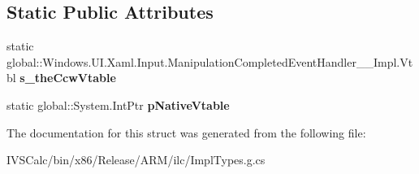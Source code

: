 \subsection*{Static Public Attributes}
\begin{DoxyCompactItemize}
\item 
\mbox{\label{struct_windows_1_1_u_i_1_1_xaml_1_1_input_1_1_manipulation_completed_event_handler_____impl_1_1_vtbl_adf2688a26a99e157d864b16386304f2d}} 
static global\+::\+Windows.\+U\+I.\+Xaml.\+Input.\+Manipulation\+Completed\+Event\+Handler\+\_\+\+\_\+\+Impl.\+Vtbl {\bfseries s\+\_\+the\+Ccw\+Vtable}
\item 
\mbox{\label{struct_windows_1_1_u_i_1_1_xaml_1_1_input_1_1_manipulation_completed_event_handler_____impl_1_1_vtbl_a85fcd24abcd8438395a05206d73fd574}} 
static global\+::\+System.\+Int\+Ptr {\bfseries p\+Native\+Vtable}
\end{DoxyCompactItemize}


The documentation for this struct was generated from the following file\+:\begin{DoxyCompactItemize}
\item 
I\+V\+S\+Calc/bin/x86/\+Release/\+A\+R\+M/ilc/Impl\+Types.\+g.\+cs\end{DoxyCompactItemize}

